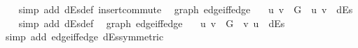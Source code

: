 \begin{isabellebody}
%
\isadelimproof
\ \ %
\endisadelimproof
%
\isatagproof
{}\isamarkupfalse%
\ {\isacharparenleft}{\kern0pt}simp\ add{\isacharcolon}{\kern0pt}\ dEs{\isacharunderscore}{\kern0pt}def\ insert{\isacharunderscore}{\kern0pt}commute{\isacharparenright}{\kern0pt}%
\endisatagproof
{\isafoldproof}%
%
\isadelimproof
\isanewline
%
\endisadelimproof
%
\isadeliminvisible
\isanewline
%
\endisadeliminvisible
%
\isataginvisible
{}\isamarkupfalse%
\ {\isacharparenleft}{\kern0pt}\ graph{\isacharparenright}{\kern0pt}\ edge{\isacharunderscore}{\kern0pt}iff{\isacharunderscore}{\kern0pt}edge{\isacharunderscore}{\kern0pt}{}{\isacharcolon}{\kern0pt}\isanewline
\ \ \ {\isachardoublequoteopen}{\isacharbraceleft}{\kern0pt}u{\isacharcomma}{\kern0pt}\ v{\isacharbraceright}{\kern0pt}\ {\isasymin}\ G\ {\isasymlongleftrightarrow}\ {\isacharparenleft}{\kern0pt}u{\isacharcomma}{\kern0pt}\ v{\isacharparenright}{\kern0pt}\ {\isasymin}\ dEs{\isachardoublequoteclose}%
\endisataginvisible
{\isafoldinvisible}%
%
\isadeliminvisible
\isanewline
%
\endisadeliminvisible
%
\isadelimproof
\ \ %
\endisadelimproof
%
\isatagproof
{}\isamarkupfalse%
\ {\isacharparenleft}{\kern0pt}simp\ add{\isacharcolon}{\kern0pt}\ dEs{\isacharunderscore}{\kern0pt}def{\isacharparenright}{\kern0pt}%
\endisatagproof
{\isafoldproof}%
%
\isadelimproof
\isanewline
%
\endisadelimproof
%
\isadeliminvisible
\isanewline
%
\endisadeliminvisible
%
\isataginvisible
{}\isamarkupfalse%
\ {\isacharparenleft}{\kern0pt}\ graph{\isacharparenright}{\kern0pt}\ edge{\isacharunderscore}{\kern0pt}iff{\isacharunderscore}{\kern0pt}edge{\isacharunderscore}{\kern0pt}{}{\isacharcolon}{\kern0pt}\isanewline
\ \ \ {\isachardoublequoteopen}{\isacharbraceleft}{\kern0pt}u{\isacharcomma}{\kern0pt}\ v{\isacharbraceright}{\kern0pt}\ {\isasymin}\ G\ {\isasymlongleftrightarrow}\ {\isacharparenleft}{\kern0pt}v{\isacharcomma}{\kern0pt}\ u{\isacharparenright}{\kern0pt}\ {\isasymin}\ dEs{\isachardoublequoteclose}%
\endisataginvisible
{\isafoldinvisible}%
%
\isadeliminvisible
\isanewline
%
\endisadeliminvisible
%
\isadelimproof
\ \ %
\endisadelimproof
%
\isatagproof
{}\isamarkupfalse%
\ {\isacharparenleft}{\kern0pt}simp\ add{\isacharcolon}{\kern0pt}\ edge{\isacharunderscore}{\kern0pt}iff{\isacharunderscore}{\kern0pt}edge{\isacharunderscore}{\kern0pt}{}\ dEs{\isacharunderscore}{\kern0pt}symmetric{\isacharparenright}{\kern0pt}%
\endisatagproof
{\isafoldproof}%
%
\isadelimproof
\isanewline
%
\endisadelimproof

\end{isabellebody}
